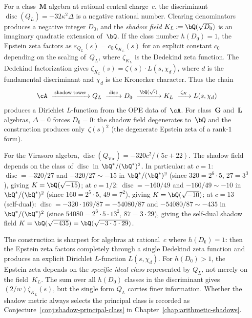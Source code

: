 \begin{remark}
\label{rem:shadow-field}
For a class~$\mathbf{M}$ algebra at rational central charge~$c$,
the discriminant $\operatorname{disc}(Q_L) = -32\kappa^2\Delta$
is a negative rational number.  Clearing denominators produces
a negative integer $D_0$, and the
\emph{shadow field}
$K_L := \bQ(\sqrt{D_0})$
is an imaginary quadratic extension of~$\bQ$.
If the class number $h(D_0) = 1$, the Epstein zeta factors as
$\varepsilon_{Q_L}(s) = c_0\,\zeta_{K_L}(s)$
for an explicit constant $c_0$ depending on the scaling of~$Q_L$,
where $\zeta_{K_L}$ is the Dedekind zeta function.
The Dedekind factorization gives
$\zeta_{K_L}(s) = \zeta(s) \cdot L(s, \chi_{d})$,
where $d$ is the fundamental discriminant and
$\chi_d$ is the Kronecker character.
Thus the chain
\[
  \cA
  \;\xrightarrow{\;\mathrm{shadow\;tower}\;}
  Q_L
  \;\xrightarrow{\;\operatorname{disc}\;}
  D_0
  \;\xrightarrow{\;\bQ(\sqrt{\cdot})\;}
  K_L
  \;\xrightarrow{\;\zeta_K\;}
  L(s, \chi_d)
\]
produces a Dirichlet $L$-function from the
OPE data of~$\cA$.
For class~$\mathbf{G}$ and~$\mathbf{L}$ algebras,
$\Delta = 0$ forces $D_0 = 0$:
the shadow field degenerates to~$\bQ$ and the construction
produces only~$\zeta(s)^2$
\textup{(}the degenerate Epstein zeta of a rank-$1$ form\textup{)}.

For the Virasoro algebra,
$\operatorname{disc}(Q_{\mathrm{Vir}}) = -320c^2/(5c{+}22)$.
The shadow field depends on the class of
$\operatorname{disc}$ in $\bQ^*/(\bQ^*)^2$.
In particular:
at $c = 1$: $\operatorname{disc} = -320/27$ and
$-320/27 \sim -15$ in $\bQ^*/(\bQ^*)^2$
\textup{(}since $320 = 2^6 \cdot 5$, $27 = 3^3$\textup{)},
giving $K = \bQ(\sqrt{-15})$;
at $c = 1/2$: $\operatorname{disc} = -160/49$ and
$-160/49 \sim -10$ in $\bQ^*/(\bQ^*)^2$
\textup{(}since $160 = 2^5 \cdot 5$, $49 = 7^2$\textup{)},
giving $K = \bQ(\sqrt{-10})$;
at $c = 13$ \textup{(}self-dual\textup{)}:
$\operatorname{disc} = -320 \cdot 169/87
= -54080/87$ and
$-54080/87 \sim -435$ in $\bQ^*/(\bQ^*)^2$
\textup{(}since $54080 = 2^6 \cdot 5 \cdot 13^2$,
$87 = 3 \cdot 29$\textup{)},
giving the self-dual shadow field
$K = \bQ(\sqrt{-435})
= \bQ(\sqrt{-3 \cdot 5 \cdot 29})$.

The construction is sharpest for algebras at rational~$c$
where $h(D_0) = 1$: then the Epstein zeta factors completely
through a single Dedekind zeta function and produces an explicit
Dirichlet $L$-function $L(s, \chi_d)$.
For $h(D_0) > 1$, the Epstein zeta depends on the
\emph{specific ideal class} represented by $Q_L$, not merely on
the field~$K_L$.  The sum over all $h(D_0)$ classes in the
discriminant gives $(2/w)\zeta_{K_L}(s)$, but the single form
$Q_L$ carries finer information.
Whether the shadow metric always selects the principal class
is recorded as
Conjecture~\textup{\ref{conj:shadow-principal-class}}
in Chapter~\textup{\ref{chap:arithmetic-shadows}}.
\end{remark}

